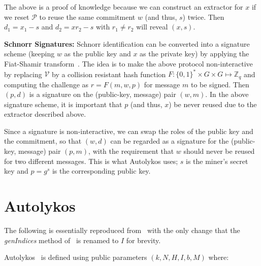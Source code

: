 \documentclass[11pt]{article}
\newcommand{\powname}{Autolykos\xspace}
\begin{document}
The above is a proof of knowledge because we can construct an extractor for $x$ if we reset $\mathcal{P}$ to reuse the same commitment $w$ (and thus, $s$) twice. Then $d_1=x_1 - s$ and $d_2=xr_2-s$ with $r_1 \neq r_2$ will reveal $(x, s)$.

\textbf{Schnorr Signatures:}
Schnorr identification can be converted into a signature scheme (keeping $w$ as the public key and $x$ as the private key) by applying the Fiat-Shamir transform~\cite{fiatshamir}. The idea is to make the above protocol non-interactive by replacing $\mathcal{V}$ by a collision resistant hash function 
$F:\{0,1\}^*\times G\times G\mapsto \mathbb{Z}_q$ and computing the challenge as $r = F(m,w,{p})$ for message $m$ to be signed. Then $(p, d)$ is a signature on the (public-key, message) pair $(w, m)$. 
In the above signature scheme, it is important that $p$ (and thus, $x$) be never reused due to the extractor described above. 

Since a signature is non-interactive, we can swap the roles of the public key and the commitment, so that $(w, d)$ can be regarded as a signature for the (public-key, message) pair $(p, m)$, with the requirement that $w$ should never be reused for two different messages. This is what \powname uses; ${s}$ is the miner's secret key and ${p} = g^{s}$ is the corresponding public key. 



\section{\powname}
\label{pow}

The following is essentially reproduced from~\cite{autolykos} with the only change that the {\em genIndices} method of~\cite{autolykos} is renamed to $I$ for brevity.

\powname~\cite{autolykos} is defined using public parameters $(k, N, H, I, b, M)$ where:
\end{document}
